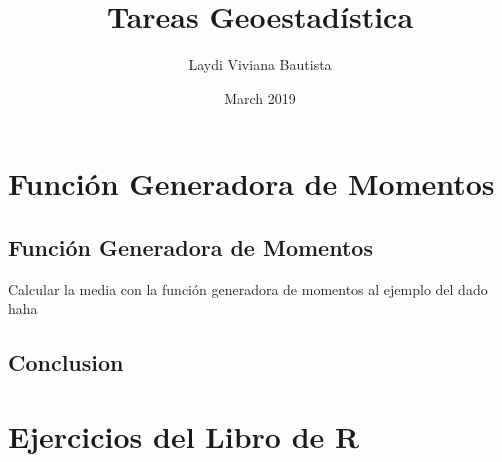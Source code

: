 \documentclass{book}
\title{Tareas Geoestadística}
\author{Laydi Viviana Bautista}
\date{March 2019}
\begin{document}



\chapter{Función Generadora de Momentos}



\section{Función Generadora de Momentos} Calcular la media con la función generadora de momentos al ejemplo del dado haha


\section{Conclusion}


\chapter{Ejercicios del Libro de R}



\end{document}
